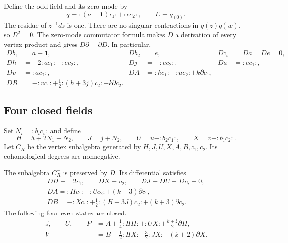 Define the odd field and its zero mode by
\begin{equation}\label{eq:cbc27-q}
 q=:(a-\mathbf1)c_1:+:ec_2:,
 \qquad D=q_{(0)}.
\end{equation}
The residue of $z^{-1}dz$ is one.
There are no singular contractions in $q(z)q(w)$, so $D^2=0$.
The zero-mode commutator formula makes $D$ a derivation of every vertex product and gives $D\partial=\partial D$.
In particular,
\begin{align*}
 Db_1&=a-\mathbf1,&Db_2&=e,&Dc_i&=Da=De=0,\\
 Dh&=-2:ac_1:-:ec_2:,&Dj&=-:ec_2:,&Du&=:ec_1:,\\
 Dv&=:ac_2:,&DA&=:hc_1:-:uc_2:+k\partial c_1,\\
 DB&=-:vc_1:+\tfrac12:(h+3j)c_2:+k\partial c_2.
\end{align*}

\subsection{Four closed fields}

Set $N_i=:b_ic_i:$ and define
\begin{equation}\label{eq:cbc27-modified}
 H=h+2N_1+N_2,\qquad J=j+N_2,\qquad
 U=u-:b_2c_1:,\qquad X=v-:b_1c_2:.
\end{equation}
Let $C_R^-$ be the vertex subalgebra generated by $H,J,U,X,A,B,c_1,c_2$.
Its cohomological degrees are nonnegative.

\begin{lemma}\label{lem:cbc27-closed}
The subalgebra $C_R^-$ is preserved by $D$.
Its differential satisfies
\begin{equation}\label{eq:cbc27-doublets}
\begin{gathered}
 DH=-2c_1,\qquad DX=c_2,\qquad DJ=DU=Dc_i=0,\\
 DA=:Hc_1:-:Uc_2:+(k+3)\partial c_1,\\
 DB=-:Xc_1:+\tfrac12:(H+3J)c_2:+(k+3)\partial c_2.
\end{gathered}
\end{equation}
The following four even states are closed:
\begin{equation}\label{eq:cbc27-generators}
 \begin{split}
 J,\qquad U,\qquad
 P&=A+\tfrac14:HH:+:UX:+\tfrac{k+2}{2}\partial H,\\
 V&=B-\tfrac12:HX:-\tfrac32:JX:-(k+2)\partial X.
 \end{split}
\end{equation}
\end{lemma}

